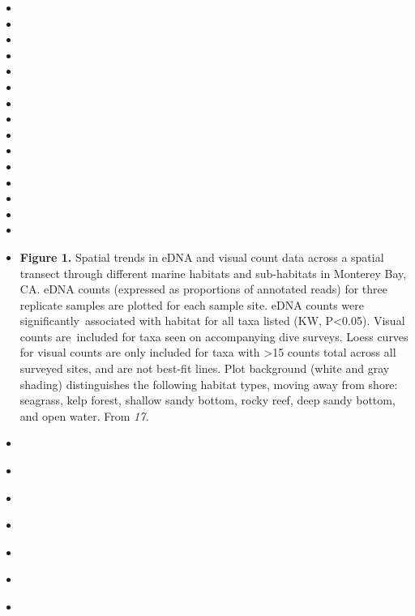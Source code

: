 \documentclass[]{article}
\begin{document}
\begin{itemize}
\item
\item
\item
\item
\item
\item
\item
\item
\item
\item
\item
\item
\item
\item
\item
\item
  \textbf{Figure 1.} Spatial trends in eDNA and visual count data across
  a spatial transect through different marine habitats and sub-habitats
  in Monterey Bay, CA. eDNA counts (expressed as proportions of
  annotated reads) for three replicate samples are plotted for each
  sample site. eDNA counts were significantly~associated with habitat
  for all taxa listed (KW, P\textless{}0.05). Visual counts are~included
  for taxa seen on accompanying dive surveys. Loess curves for visual
  counts are only included for taxa with \textgreater{}15 counts total
  across all surveyed sites, and are not best-fit lines. Plot background
  (white and gray shading) distinguishes the following habitat types,
  moving away from shore: seagrass, kelp forest, shallow sandy bottom,
  rocky reef, deep sandy bottom, and open water. From \emph{17.}
\item
  \emph{}
\item
  \emph{}
\item
  \emph{}
\item
  \emph{}
\item
  \emph{}
\item
  \emph{}
\item
  \emph{}
\end{itemize}

\emph{}\\

\emph{}\\

\emph{}\\

\emph{}\\

\emph{}\\

\emph{}\\
\end{document}
